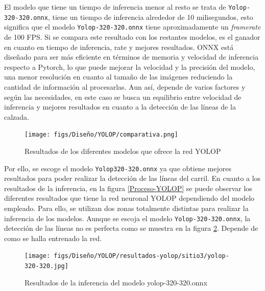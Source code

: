 El modelo que tiene un tiempo de inferencia menor al resto se trata de \texttt{Yolop-320-320.onnx}, tiene un tiempo de inferencia alrededor de 10 milisegundos, esto
significa que el modelo \texttt{Yolop-320-320.onnx} tiene aproximadamente un \textit{framerate} de 100 FPS. Si se compara este resultado con los restantes modelos, es el ganador en cuanto 
en tiempo de inferencia, rate y mejores resultados. 
ONNX está diseñado para ser más eficiente en términos de memoria y velocidad de inferencia respecto a Pytorch, lo que puede mejorar la velocidad y la precisión
del modelo, una menor resolución en cuanto al tamaño de las imágenes reduciendo la cantidad de información al procesarlas. Aun así, depende de varios factores y según las necesidades, 
en este caso se busca un equilibrio entre velocidad de inferencia y mejores resultados en cuanto a la detección de las líneas de la calzada. 

\begin{figure} [H]
  \begin{center}
    \texttt{[image: figs/Diseño/YOLOP/comparativa.png]}
  \end{center}
  \caption{Resultados de los diferentes modelos que ofrece la red YOLOP}
  \label{fig:resultados_pesos_preentrenados}
  \vspace{-1.5em}
\end{figure}
Por ello, se escoge el modelo \texttt{Yolop320-320.onnx} ya que obtiene mejores resultados para poder realizar la detección de las líneas del carril. 
En cuanto a los resultados de la inferencia, en la figura \ref{Proceso-YOLOP} 
se puede observar los diferentes resultados que tiene la red neuronal YOLOP dependiendo del modelo empleado. Para ello, se utilizan dos zonas totalmente distintas para realizar 
la inferencia de los modelos. Aunque se escoja el modelo \texttt{Yolop-320-320.onnx}, la detección de las líneas no es perfecta como se muestra en la figura 
\ref{f:Inferencia320-320}. Depende de como se halla entrenado la red. 
\begin{figure} [H]
  \begin{center}
    \texttt{[image: figs/Diseño/YOLOP/resultados-yolop/sitio3/yolop-320-320.jpg]}
  \end{center}
  \caption{Resultados de la inferencia del modelo yolop-320-320.onnx}
  \label{f:Inferencia320-320}
  \vspace{-1.5em}
\end{figure}

